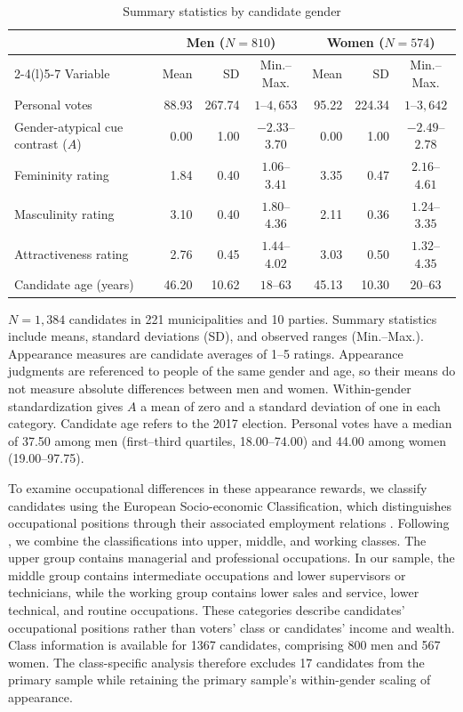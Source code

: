 \documentclass[11pt,a4paper]{article}\usepackage[]{graphicx}\usepackage[]{xcolor}
\begin{document}
\begin{table}[!htbp]
\centering\small
\caption{Summary statistics by candidate gender}
\label{tab:summary}
\begin{tabular}{@{}lrrc@{\hspace{1.5em}}rrc@{}}
\toprule
 & \multicolumn{3}{c}{Men ($N=810$)} & \multicolumn{3}{c}{Women ($N=574$)} \\
\cmidrule(lr){2-4}\cmidrule(l){5-7}
Variable & Mean & SD & Min.--Max. & Mean & SD & Min.--Max. \\
\midrule
Personal votes & 88.93 & 267.74 & $1$--$4,653$ & 95.22 & 224.34 & $1$--$3,642$ \\
Gender-atypical cue contrast ($A$) & 0.00 & 1.00 & $-2.33$--$3.70$ & 0.00 & 1.00 & $-2.49$--$2.78$ \\
Femininity rating & 1.84 & 0.40 & $1.06$--$3.41$ & 3.35 & 0.47 & $2.16$--$4.61$ \\
Masculinity rating & 3.10 & 0.40 & $1.80$--$4.36$ & 2.11 & 0.36 & $1.24$--$3.35$ \\
Attractiveness rating & 2.76 & 0.45 & $1.44$--$4.02$ & 3.03 & 0.50 & $1.32$--$4.35$ \\
Candidate age (years) & 46.20 & 10.62 & $18$--$63$ & 45.13 & 10.30 & $20$--$63$ \\
\bottomrule
\end{tabular}
\par\smallskip
\begin{minipage}{\linewidth}\footnotesize
$N=1,384$ candidates in 221 municipalities and 10 parties. Summary statistics include means, standard deviations (SD), and observed ranges (Min.--Max.). Appearance measures are candidate averages of 1--5 ratings. Appearance judgments are referenced to people of the same gender and age, so their means do not measure absolute differences between men and women. Within-gender standardization gives $A$ a mean of zero and a standard deviation of one in each category. Candidate age refers to the 2017 election. Personal votes have a median of 37.50 among men (first--third quartiles, 18.00--74.00) and 44.00 among women (19.00--97.75).
\end{minipage}
\end{table}

To examine occupational differences in these appearance rewards, we classify candidates using the European Socio-economic Classification, which distinguishes occupational positions through their associated employment relations \parencite{RoseHarrison2007}. Following \textcite{Bahamonde2024}, we combine the classifications into upper, middle, and working classes. The upper group contains managerial and professional occupations. In our sample, the middle group contains intermediate occupations and lower supervisors or technicians, while the working group contains lower sales and service, lower technical, and routine occupations. These categories describe candidates' occupational positions rather than voters' class or candidates' income and wealth. Class information is available for 1367 candidates, comprising 800 men and 567 women. The class-specific analysis therefore excludes 17 candidates from the primary sample while retaining the primary sample's within-gender scaling of appearance.
\end{document}
